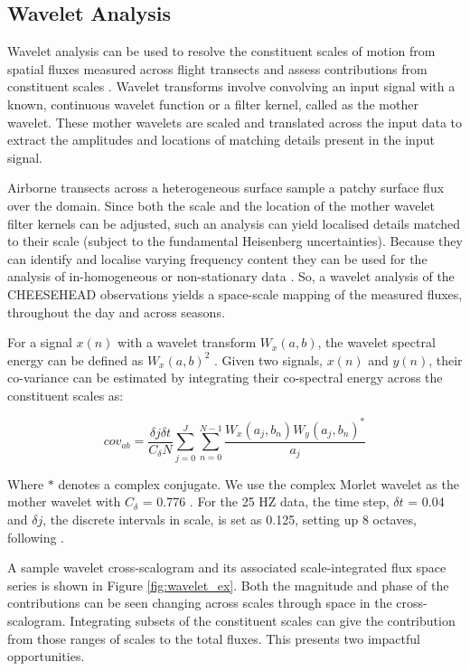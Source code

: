 \documentclass[draft]{agujournal2019}
\begin{document}
\subsection{Wavelet Analysis}
Wavelet analysis can be used to resolve the constituent scales of motion from spatial fluxes measured across flight transects and assess contributions from constituent scales \cite{mahrt_observations_1994, strunin_aircraft_2004, mauder_energy_2007}. Wavelet transforms involve convolving an input signal with a known, continuous wavelet function \cite{torrence_practical_1998} or a filter kernel, called as the mother wavelet. These mother wavelets are scaled and translated across the input data to extract the amplitudes and locations of matching details present in the input signal.

Airborne transects across a heterogeneous surface sample a patchy surface flux over the domain. Since both the scale and the location of the mother wavelet filter kernels can be adjusted, such an analysis can yield localised details matched to their scale (subject to the fundamental Heisenberg uncertainties). Because they can identify and localise varying frequency content they can be used for the analysis of in-homogeneous or non-stationary data \cite{cuxart_study_2002, strunin_applying_2004}. So, a wavelet analysis of the CHEESEHEAD observations yields a space-scale mapping of the measured fluxes, throughout the day and across seasons. 

For a signal $x(n)$ with a wavelet transform $W_x(a,b)$, the wavelet spectral energy can be defined as $W_x(a,b)^{2}$ . Given two signals, $x(n)$ and $y(n)$, their co-variance can be estimated by integrating their co-spectral energy across the constituent scales as:

 \begin{equation}
cov_{ab} = \frac{\delta j \delta t}{C_\delta N}\sum_{j=0}^{J}\sum_{n=0}^{N-1}\frac{W_x(a_j,b_n)W_y(a_j,b_n)^{*}}{a_j}
 \end{equation}
 
Where $*$ denotes a complex conjugate. We use the complex Morlet wavelet as the mother wavelet with $C_\delta$ = 0.776 \cite{torrence_practical_1998}. For the 25 HZ data, the time step, $\delta t$ = 0.04 and $\delta j$, the discrete intervals in scale, is set as 0.125, setting up 8 octaves, following . 

A sample wavelet cross-scalogram and its associated scale-integrated flux space series is shown in Figure \ref{fig:wavelet_ex}. Both the magnitude and phase of the contributions can be seen changing across scales through space in the cross-scalogram. Integrating subsets of the constituent scales can give the contribution from those ranges of scales to the total fluxes. This presents two impactful opportunities. 
\end{document}
